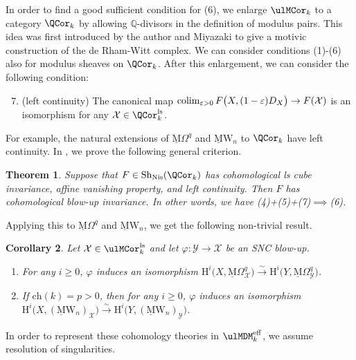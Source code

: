 \documentclass{amsart}
\theoremstyle{plain}
\newtheorem{theorem}{Theorem}[section]
\newtheorem{corollary}[theorem]{Corollary}
\theoremstyle{definition}
\theoremstyle{remark}
\numberwithin{equation}{section}
\DeclareMathOperator{\Sh}{Sh}
\def\Nis{\mathrm{Nis}}
\def\eff{\mathrm{eff}}
\def\ch{\mathrm{ch}}
\def\ls{\mathrm{ls}}
\def\MOmega{\underline{\mathrm{M}}\Omega}
\def\MW{\underline{\mathrm{M}}\mathrm{W}}
\begin{document}
In order to find a good sufficient condition for (6), we enlarge $\ulMCor_k$ to a category $\QCor_k$ by allowing $\mathbb{Q}$-divisors in the definition of modulus pairs.
This idea was first introduced by the author and Miyazaki \cite{Koizumi-Miyazaki} to give a motivic construction of the de Rham-Witt complex.
We can consider conditions (1)-(6) also for modulus sheaves on $\QCor_k$.
After this enlargement, we can consider the following condition:
\begin{enumerate}\setcounter{enumi}{6}
	\item	(left continuity) The canonical map
	$\operatorname*{colim}_{\varepsilon>0} F\bigl(X,(1-\varepsilon)D_X\bigr)\to F(\mathcal{X})$
	is an isomorphism for any $\mathcal{X}\in \QCor_k^\ls$.
\end{enumerate}
For example, the natural extensions of $\MOmega^q$ and $\MW_n$ to $\QCor_k$ have left continuity.
In , we prove the following general criterion.

\begin{theorem}\label{main}
	Suppose that $F\in \Sh_\Nis(\QCor_k)$ has cohomological ls cube invariance, affine vanishing property, and left continuity.
	Then $F$ has cohomological blow-up invariance.
	In other words, we have (4)+(5)+(7)$\implies$(6).
\end{theorem}

Applying this to $\MOmega^q$ and $\MW_n$, we get the following non-trivial result.

\begin{corollary}\label{omega_witt_CBI}
	Let $\mathcal{X}\in \ulMCor_k^\ls$ and let $\varphi\colon \mathcal{Y}\to \mathcal{X}$ be an SNC blow-up.
	\begin{enumerate}
		\item	For any $i\geq 0$, $\varphi$ induces an isomorphism
				$\mathrm{H}^i\bigl(X,\MOmega^q_\mathcal{X})\xrightarrow{\sim} \mathrm{H}^i\bigl(Y,\MOmega^q_\mathcal{Y}\bigr)$.
		\item	If $\ch(k)=p>0$, then for any $i\geq 0$, $\varphi$ induces an isomorphism
				$\mathrm{H}^i\bigl(X,(\MW_n)_\mathcal{X}\bigr)
					\xrightarrow{\sim}
					\mathrm{H}^i\bigl(Y,(\MW_n)_\mathcal{Y}\bigr)$.
	\end{enumerate}
\end{corollary}



In order to represent these cohomology theories in $\ulMDM^\eff_k$, we assume resolution of singularities.
\end{document}
